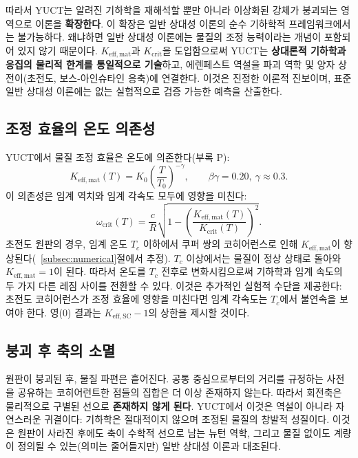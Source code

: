 \documentclass[12pt,a4paper]{article}
\newcommand{\Keffmat}{K_{\mathrm{eff,mat}}}
\newcommand{\Kcrit}{K_{\mathrm{crit}}}
\begin{document}
	따라서 YUCT는 알려진 기하학을 재해석할 뿐만 아니라 이상화된 강체가 붕괴되는 영역으로 이론을 \textbf{확장한다}. 이 확장은 일반 상대성 이론의 순수 기하학적 프레임워크에서는 불가능하다. 왜냐하면 일반 상대성 이론에는 물질의 조정 능력이라는 개념이 포함되어 있지 않기 때문이다. \(\Keffmat\)과 \(\Kcrit\)을 도입함으로써 YUCT는 \textbf{상대론적 기하학과 응집의 물리적 한계를 통일적으로 기술}하고, 에렌페스트 역설을 파괴 역학 및 양자 상전이(초전도, 보스-아인슈타인 응축)에 연결한다. 이것은 진정한 이론적 진보이며, 표준 일반 상대성 이론에는 없는 실험적으로 검증 가능한 예측을 산출한다.
	
	\subsection{조정 효율의 온도 의존성}
	
	YUCT에서 물질 조정 효율은 온도에 의존한다(부록 P):
	\[
	K_{\mathrm{eff,mat}}(T) = K_0 \left( \frac{T}{T_0} \right)^{-\gamma}, \qquad \beta\gamma = 0.20,\ \gamma \approx 0.3.
	\]
	이 의존성은 임계 역치와 임계 각속도 모두에 영향을 미친다:
	\[
	\omega_{\text{crit}}(T) = \frac{c}{R} \sqrt{1 - \left( \frac{K_{\mathrm{eff,mat}}(T)}{K_{\mathrm{crit}}(T)} \right)^2 }.
	\]
	초전도 원판의 경우, 임계 온도 \(T_c\) 이하에서 쿠퍼 쌍의 코히어런스로 인해 \(K_{\mathrm{eff,mat}}\)이 향상된다(~\ref{subsec:numerical}절에서 추정). \(T_c\) 이상에서는 물질이 정상 상태로 돌아와 \(K_{\mathrm{eff,mat}} = 1\)이 된다. 따라서 온도를 \(T_c\) 전후로 변화시킴으로써 기하학과 임계 속도의 두 가지 다른 레짐 사이를 전환할 수 있다. 이것은 추가적인 실험적 수단을 제공한다: 초전도 코히어런스가 조정 효율에 영향을 미친다면 임계 각속도는 \(T_c\)에서 불연속을 보여야 한다. 영(0) 결과는 \(K_{\mathrm{eff,SC}} - 1\)의 상한을 제시할 것이다.
	
	\subsection{붕괴 후 축의 소멸}
	
	원판이 붕괴된 후, 물질 파편은 흩어진다. 공통 중심으로부터의 거리를 규정하는 사전을 공유하는 코히어런트한 점들의 집합은 더 이상 존재하지 않는다. 따라서 회전축은 물리적으로 구별된 선으로 \textbf{존재하지 않게 된다}. YUCT에서 이것은 역설이 아니라 자연스러운 귀결이다: 기하학은 절대적이지 않으며 조정된 물질의 창발적 성질이다. 이것은 원판이 사라진 후에도 축이 수학적 선으로 남는 뉴턴 역학, 그리고 물질 없이도 계량이 정의될 수 있는(의미는 줄어들지만) 일반 상대성 이론과 대조된다.
	
\end{document}
